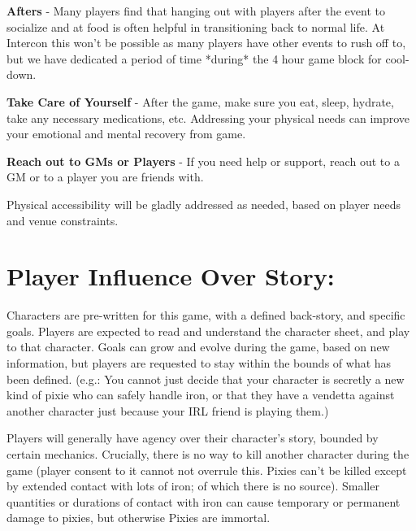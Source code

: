 \documentclass[sheet]{PP}
\begin{document}
\begin{itemz}
	\item \textbf{Afters} - Many players find that hanging out with players after the event to socialize and at food is often helpful in transitioning back to normal life. At Intercon this won’t be possible as many players have other events to rush off to, but we have dedicated a period of time *during* the 4 hour game block for cool-down.
	\item \textbf{Take Care of Yourself} - After the game, make sure you eat, sleep, hydrate, take any necessary medications, etc. Addressing your physical needs can improve your emotional and mental recovery from game.
	\item \textbf{Reach out to GMs or Players} - If you need help or support, reach out to a GM or to a player you are friends with.
\end{itemz}

Physical accessibility will be gladly addressed as needed, based on player needs and venue constraints.

\section*{Player Influence Over Story:}
Characters are pre-written for this game, with a defined back-story, and specific goals. Players are expected to read and understand the character sheet, and play to that character. Goals can grow and evolve during the game, based on new information, but players are requested to stay within the bounds of what has been defined. (e.g.: You cannot just decide that your character is secretly a new kind of pixie who can safely handle iron, or that they have a vendetta against another character just because your IRL friend is playing them.)

Players will generally have agency over their character’s story, bounded by certain mechanics. Crucially, there is no way to kill another character during the game (player consent to it cannot not overrule this. Pixies can’t be killed except by extended contact with lots of iron; of which there is no source). Smaller quantities or durations of contact with iron can cause temporary or permanent damage to pixies, but otherwise Pixies are immortal.
\end{document}
